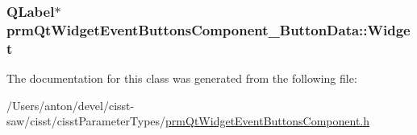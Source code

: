 \subsubsection[{Widget}]{\setlength{\rightskip}{0pt plus 5cm}Q\+Label$\ast$ prm\+Qt\+Widget\+Event\+Buttons\+Component\+\_\+\+Button\+Data\+::\+Widget}\label{classprm_qt_widget_event_buttons_component___button_data_a494181775f0be5959a4cb2a4f4e71288}


The documentation for this class was generated from the following file\+:\begin{DoxyCompactItemize}
\item 
/\+Users/anton/devel/cisst-\/saw/cisst/cisst\+Parameter\+Types/\hyperlink{prm_qt_widget_event_buttons_component_8h}{prm\+Qt\+Widget\+Event\+Buttons\+Component.\+h}\end{DoxyCompactItemize}
